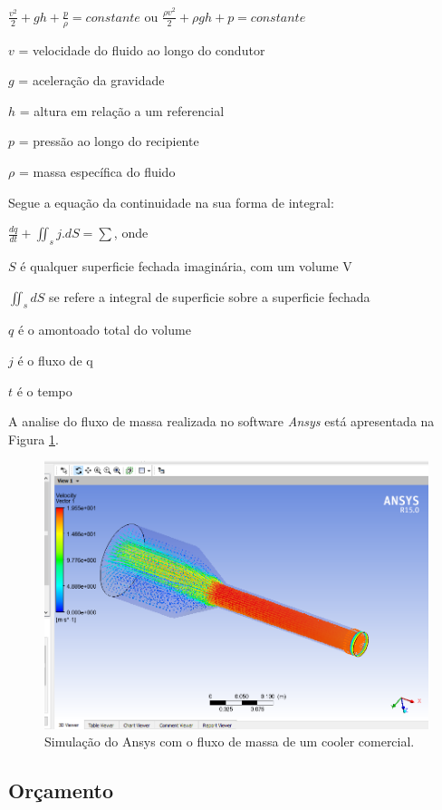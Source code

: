 		$\frac{v^{2}}{2} + gh + \frac{p}{\rho} = constante$ ou $\frac{\rho v^{2}}{2} + \rho gh + p = constante$

		$v$ = velocidade do fluido ao longo do condutor

		$g$ = aceleração da gravidade
		
		$h$ = altura em relação a um referencial
		
		$p$ = pressão ao longo do recipiente
		
		$\rho$ = massa específica do fluido

		Segue a equação da continuidade na sua forma de integral:

		$\frac{dq}{dt} + \iint_{s}^{ }j . dS= \sum$, onde

		$S$ é qualquer superficie fechada imaginária, com um volume V

		$\iint_{s}^{ }dS$ se refere a integral de superficie sobre a superficie fechada

		$q$ é o amontoado total do volume

		$j$ é o fluxo de q

		$t$ é o tempo


		A analise do fluxo de massa realizada no software \textit{Ansys} está apresentada na Figura \ref{img:analise_fluxo}.

		\begin{figure}[H]
			\centering
			\includegraphics[scale=0.4]{figuras/analise_fluxo.png}
			\caption{Simulação do Ansys com o fluxo de massa de um cooler comercial.}
			\label{img:analise_fluxo}
		\end{figure}

		\subsection{Orçamento} %
		\label{sub:orçamento}
			
